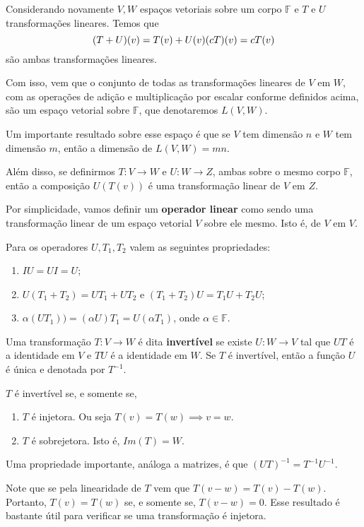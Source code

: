 \documentclass[12pt,a4paper]{article}
\begin{document}
Considerando novamente $V, W$ espaços vetoriais sobre um corpo $\mathbb{F}$ e $T$ e $U$ transformações lineares. Temos que 
$$
(T+U)(v) = T(v)+U(v) \\
(cT)(v) = cT(v)
$$
são ambas transformações lineares.

Com isso, vem que o conjunto de todas as transformações lineares de $V$ em $W$, com as operações de adição e multiplicação por escalar conforme definidos acima, são um espaço vetorial sobre $\mathbb{F}$, que denotaremos $L(V,W)$.

Um importante resultado sobre esse espaço é que se $V$ tem dimensão $n$ e $W$ tem dimensão $m$, então a dimensão de $L(V,W) = mn$.  

Além disso, se definirmos $T:V \to W$ e $U : W \to Z$, ambas sobre o mesmo corpo $\mathbb{F}$, então a composição $U(T(v))$ é uma transformação linear de $V$ em $Z$.

Por simplicidade, vamos definir um \textbf{operador linear} como sendo uma transformação linear de um espaço vetorial $V$ sobre ele mesmo. Isto é, de $V$ em $V$. 

Para os operadores $U, T_1, T_2$ valem as seguintes propriedades:

\begin{enumerate}
\item $IU = UI = U$;
\item $U(T_1 +T_2) = UT_1 + UT_2$ e $(T_1 + T_2)U = T_1U + T_2U$;
\item $\alpha(UT_1)) = (\alpha U) T_1 = U(\alpha T_1)$, onde $\alpha \in \mathbb{F}$.
\end{enumerate}

Uma transformação $T: V \to W$ é dita \textbf{invertível} se existe $U : W \to V$ tal que $UT$ é a identidade em $V$ e $TU$ é a identidade em $W$. Se $T$ é invertível, então a função $U$ é única e denotada por $T^{-1}$. 

$T$ é invertível se, e somente se,

\begin{enumerate}
\item $T$ é injetora. Ou seja $T(v) = T(w) \implies v = w$.
\item $T$ é sobrejetora. Isto é, $Im(T) = W$.
\end{enumerate}

Uma propriedade importante, análoga a matrizes, é que $(UT)^{-1} = T^{-1}U^{-1}$.

Note que se pela linearidade de $T$ vem que $T(v-w) = T(v) - T(w)$. Portanto, $T(v) = T(w)$ se, e somente se, $T(v-w) = 0$. Esse resultado é bastante útil para verificar se uma transformação é injetora. 
\end{document}
